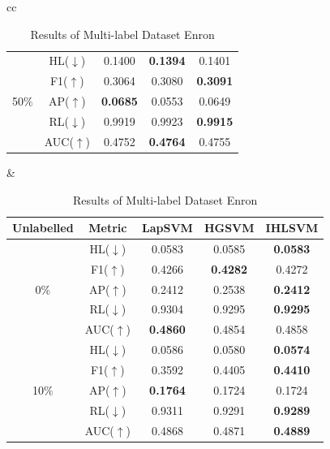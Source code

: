 \documentclass[12pt,a4paper,oneside,english]{report}
\begin{document}
\begin{table}[htbp]
\begin{tabular}{cc}
\begin{minipage}{0.5\textwidth}
\begin{tabular}{|c|c|c|c|c|}
                & HL(\(\downarrow\)) & 0.1400 & \textbf{0.1394} & 0.1401 \\
                & F1(\(\uparrow\)) & 0.3064 & 0.3080 & \textbf{0.3091} \\
                50\(\%\) & AP(\(\uparrow\)) & \textbf{0.0685} & 0.0553 & 0.0649 \\
                & RL(\(\downarrow\)) & 0.9919 & 0.9923 & \textbf{0.9915} \\
                & AUC(\(\uparrow\)) & 0.4752 & \textbf{0.4764} & 0.4755 \\
                \hline
            \end{tabular}
        \end{minipage}
        
        &
        
        \begin{minipage}{0.5\textwidth}
            \centering
            \caption*{Results of Multi-label Dataset Enron}
                \label{tabel_ml_end}
            \begin{tabular}{|c|c|c|c|c|}
                \hline
                \textbf{Unlabelled} & \textbf{Metric} & \textbf{LapSVM} & \textbf{HGSVM} & \textbf{IHLSVM} \\
                \hline
                & HL(\(\downarrow\)) & 0.0583 & 0.0585 & \textbf{0.0583} \\
                & F1(\(\uparrow\)) & 0.4266 & \textbf{0.4282} & 0.4272 \\
                0\(\%\) & AP(\(\uparrow\)) & 0.2412 & 0.2538 & \textbf{0.2412} \\
                & RL(\(\downarrow\)) & 0.9304 & 0.9295 & \textbf{0.9295} \\
                & AUC(\(\uparrow\)) & \textbf{0.4860} & 0.4854 & 0.4858 \\
                \hline
                
                & HL(\(\downarrow\)) & 0.0586 & 0.0580 & \textbf{0.0574} \\
                & F1(\(\uparrow\)) & 0.3592 & 0.4405 & \textbf{0.4410} \\
                10\(\%\) & AP(\(\uparrow\)) & \textbf{0.1764} & 0.1724 & 0.1724 \\
                & RL(\(\downarrow\)) & 0.9311 & 0.9291 & \textbf{0.9289} \\
                & AUC(\(\uparrow\)) & 0.4868 & 0.4871 & \textbf{0.4889} \\
                \hline
                

\end{tabular}
\end{minipage}
\end{tabular}
\end{table}
\end{document}
